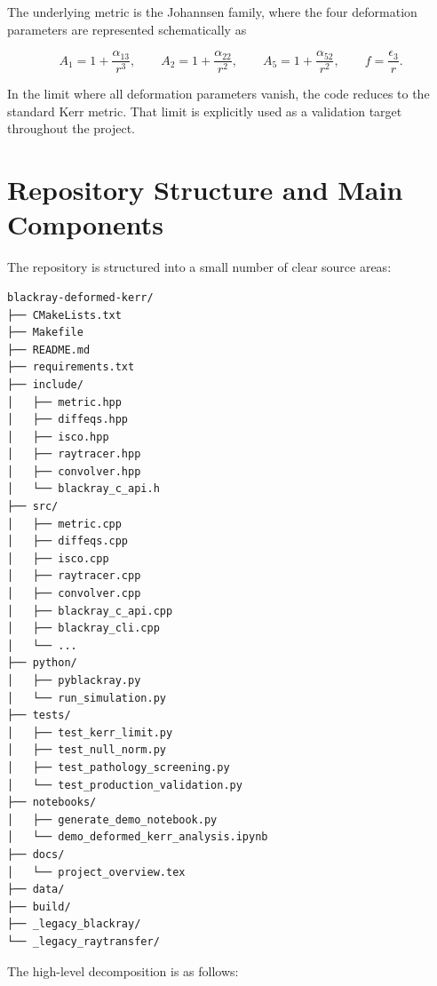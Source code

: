 \documentclass[11pt]{article}
\begin{document}
The underlying metric is the Johannsen family, where the four deformation parameters are represented schematically as

\begin{equation}
A_1 = 1 + \frac{\alpha_{13}}{r^3}, \qquad
A_2 = 1 + \frac{\alpha_{22}}{r^2}, \qquad
A_5 = 1 + \frac{\alpha_{52}}{r^2}, \qquad
f = \frac{\epsilon_3}{r}.
\end{equation}

In the limit where all deformation parameters vanish, the code reduces to the standard Kerr metric. That limit is explicitly used as a validation target throughout the project.

\section{Repository Structure and Main Components}

The repository is structured into a small number of clear source areas:

\begin{verbatim}
blackray-deformed-kerr/
├── CMakeLists.txt
├── Makefile
├── README.md
├── requirements.txt
├── include/
│   ├── metric.hpp
│   ├── diffeqs.hpp
│   ├── isco.hpp
│   ├── raytracer.hpp
│   ├── convolver.hpp
│   └── blackray_c_api.h
├── src/
│   ├── metric.cpp
│   ├── diffeqs.cpp
│   ├── isco.cpp
│   ├── raytracer.cpp
│   ├── convolver.cpp
│   ├── blackray_c_api.cpp
│   ├── blackray_cli.cpp
│   └── ...
├── python/
│   ├── pyblackray.py
│   └── run_simulation.py
├── tests/
│   ├── test_kerr_limit.py
│   ├── test_null_norm.py
│   ├── test_pathology_screening.py
│   └── test_production_validation.py
├── notebooks/
│   ├── generate_demo_notebook.py
│   └── demo_deformed_kerr_analysis.ipynb
├── docs/
│   └── project_overview.tex
├── data/
├── build/
├── _legacy_blackray/
└── _legacy_raytransfer/
\end{verbatim}

The high-level decomposition is as follows:
\end{document}
